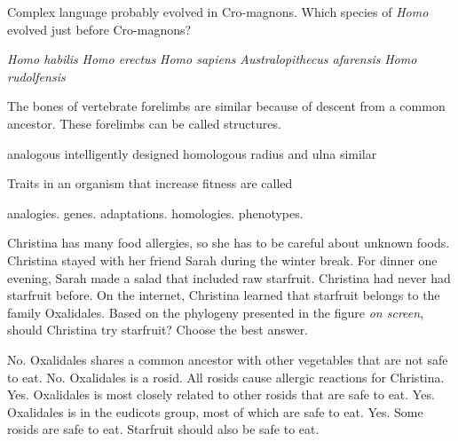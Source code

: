\question
Complex language probably evolved in Cro-magnons. Which species of \textit{Homo} evolved just before Cro-magnons?

\begin{choices}
\choice \textit{Homo habilis} %
\correctchoice \textit{Homo erectus} %
\choice \textit{Homo sapiens} %
\choice \textit{Australopithecus afarensis} %
\choice \textit{Homo rudolfensis} %
\end{choices}

\question
The bones of vertebrate forelimbs are similar because of descent from a common ancestor. These forelimbs can be called \underline{\hspace{2cm}} structures.

\begin{choices}
\choice analogous%
\choice intelligently designed%
\correctchoice homologous%
\choice radius and ulna%
\choice similar%
\end{choices}

\question
Traits in an organism that increase fitness are called

\begin{choices}
\choice analogies.%
\choice genes.%
\correctchoice adaptations.%
\choice homologies.%
\choice phenotypes.%
\end{choices}

\question
Christina has many food allergies, so she has to be careful about unknown foods.  Christina stayed with her friend Sarah during the winter break.  For dinner one evening, Sarah made a salad that included raw starfruit. Christina had never had starfruit before. On the internet, Christina learned that starfruit belongs to the family Oxalidales. Based on the phylogeny presented in the figure \textit{on screen}, should Christina try starfruit? Choose the best answer.

\begin{choices}
\correctchoice No. Oxalidales shares a common ancestor with other vegetables that are not safe to eat.%
\choice No. Oxalidales is a rosid. All rosids cause allergic reactions for Christina.%
\choice Yes. Oxalidales is most closely related to other rosids that are safe to eat.%
\choice Yes. Oxalidales is in the eudicots group, most of which are safe to eat.%
\choice Yes. Some rosids are safe to eat. Starfruit should also be safe to eat.%
\end{choices}


